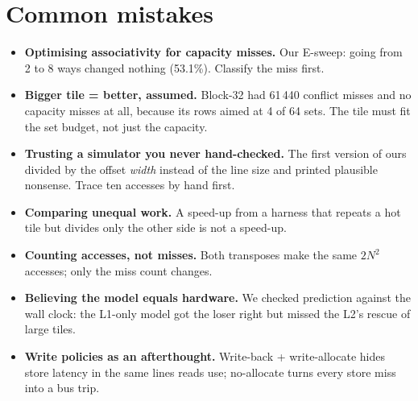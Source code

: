 \section{Common mistakes}
\label{sec:mistakes10}
\begin{itemize}
\item \textbf{Optimising associativity for capacity misses.} Our
      E-sweep: going from 2 to 8 ways changed nothing (53.1\%). Classify
      the miss first.
\item \textbf{Bigger tile = better, assumed.} Block-32 had 61\,440
      conflict misses and no capacity misses at all, because its rows
      aimed at 4 of 64 sets. The tile must fit the set budget, not just
      the capacity.
\item \textbf{Trusting a simulator you never hand-checked.} The first
      version of ours divided by the offset \emph{width} instead of the
      line size and printed plausible nonsense. Trace ten accesses by hand
      first.
\item \textbf{Comparing unequal work.} A speed-up from a harness that
      repeats a hot tile but divides only the other side is not a
      speed-up.
\item \textbf{Counting accesses, not misses.} Both transposes make
      the same $2N^2$ accesses; only the miss count changes.
\item \textbf{Believing the model equals hardware.} We checked
      prediction against the wall clock: the L1-only model got the
      loser right but missed the L2's rescue of large tiles.
\item \textbf{Write policies as an afterthought.} Write-back +
      write-allocate hides store latency in the same lines reads
      use; no-allocate turns every store miss into a bus trip.
\end{itemize}

